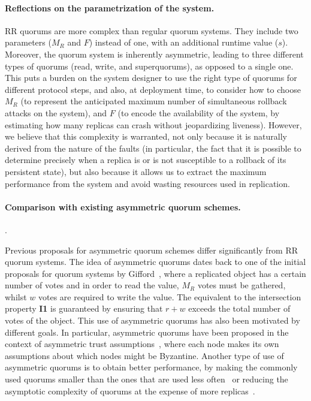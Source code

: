 \paragraph{Reflections on the parametrization of the system.}
\ac{RR} quorums are more complex than regular
quorum systems. They include two parameters ($M_R$ and $F$) instead of
one, with an additional runtime value ($s$). Moreover, the quorum
system is inherently asymmetric, leading to three different types of
quorums (read, write, and superquorums), as opposed to a single one.
This puts a burden on the system designer to use the right type of quorums for
different protocol steps, and also, at deployment time, to consider how to
choose $M_R$ (to represent the anticipated maximum number of simultaneous rollback
attacks on the system), and $F$
(to encode the availability of the system, by estimating how many replicas
can crash without jeopardizing liveness).
%
However, we believe that this complexity is warranted, not only
because it is naturally derived from the nature of the faults (in
particular, the fact that it is possible to determine precisely when a
replica is or is not susceptible to a rollback of its persistent
state), but also because it allows us to extract the maximum
performance from the system and avoid wasting resources used in
replication.

\paragraph{Comparison with existing asymmetric quorum schemes.}

.

Previous proposals for asymmetric quorum schemes differ
significantly from \ac{RR} quorum systems.  The idea of
asymmetric quorums dates back to one of the initial proposals for
quorum systems by Gifford~\cite{weighted_voting}, where a
replicated object has a certain number of votes and in order to
read the value, $M_R$ votes must be gathered, whilst $w$ votes
are required to write the value. The equivalent to the
intersection property \textbf{I1} is guaranteed by ensuring that
$r + w$ exceeds the total number of votes of the object. This use
of asymmetric quorums has also been motivated by different goals.
In particular, asymmetric quorums have been proposed in the
context of asymmetric trust assumptions~\cite{asymmetric_trust},
where each node makes its own assumptions about which nodes might
be Byzantine. Another type of use of asymmetric quorums is to
obtain better performance, by making the commonly used quorums
smaller than the ones that are used less
often~\cite{fp,wheat,rqs} or reducing the asymptotic complexity
of quorums at the expense of more replicas~\cite{grid_quorums}.

